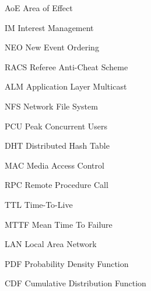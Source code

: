 \begin{Nomencl}[\gnat]
        \item[AoE]      Area of Effect
        \item[IM]       Interest Management
        \item[NEO]      New Event Ordering
        \item[RACS]     Referee Anti-Cheat Scheme
        \item[ALM]      Application Layer Multicast
        \item[NFS]      Network File System
        \item[PCU]      Peak Concurrent Users
        \item[DHT]      Distributed Hash Table
        \item[MAC]      Media Access Control
        \item[RPC]      Remote Procedure Call
        \item[TTL]      Time-To-Live
        \item[MTTF]     Mean Time To Failure
        \item[LAN]      Local Area Network
        \item[PDF]      Probability Density Function
        \item[CDF]      Cumulative Distribution Function
\end{Nomencl}
\endinput
